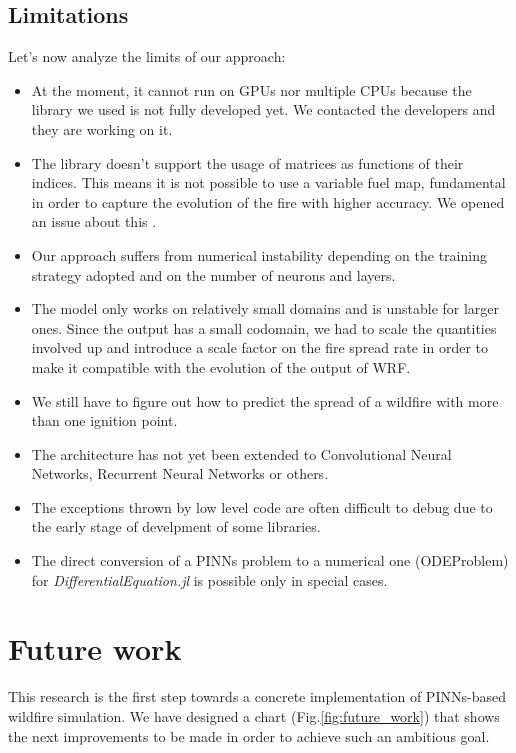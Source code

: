 \documentclass{juliacon}
\begin{document}
\subsection{Limitations}\label{limitations}
Let's now analyze the limits of our approach:

\begin{itemize}
    \itemsep0em
    \item At the moment, it cannot run on GPUs nor multiple CPUs because the library we used is not fully developed yet. We contacted the developers and they are working on it.
    \item The library doesn't support the usage of matrices as functions of their indices. This means it is not possible to use a variable fuel map, fundamental in order to capture the evolution of the fire with higher accuracy. We opened an issue about this \cite{issue177}.
    \item Our approach suffers from numerical instability depending on the training strategy adopted and on the number of neurons and layers.
    \item The model only works on relatively small domains and is unstable for larger ones. Since the output has a small codomain, we had to scale the quantities involved up and introduce a scale factor on the fire spread rate in order to make it compatible with the evolution of the output of WRF.
    \item We still have to figure out how to predict the spread of a wildfire with more than one ignition point.
    \item The architecture has not yet been extended to Convolutional Neural Networks, Recurrent Neural Networks or others.
    \item The exceptions thrown by low level code are often difficult to debug due to the early stage of develpment of some libraries.
    \item The direct conversion of a PINNs problem to a numerical one (ODEProblem) for \textit{DifferentialEquation.jl} is possible only in special cases.
\end{itemize}

\section{Future work}
This research is the first step towards a concrete implementation of PINNs-based wildfire simulation. We have designed a chart (Fig.\ref{fig:future_work}) that shows the next improvements to be made in order to achieve such an ambitious goal.
\end{document}
